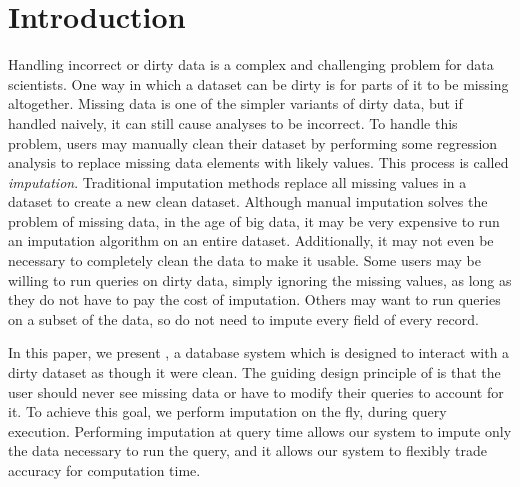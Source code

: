 \section{Introduction}

Handling incorrect or dirty data is a complex and challenging problem for data scientists.
One way in which a dataset can be dirty is for parts of it to be missing altogether.
Missing data is one of the simpler variants of dirty data, but if handled naively, it can still cause analyses to be incorrect.
To handle this problem, users may manually clean their dataset by performing some regression analysis to replace missing data elements with likely values.
This process is called \emph{imputation}.
Traditional imputation methods replace all missing values in a dataset to create a new clean dataset.
Although manual imputation solves the problem of missing data, in the age of big data, it may be very expensive to run an imputation algorithm on an entire dataset.
Additionally, it may not even be necessary to completely clean the data to make it usable.
Some users may be willing to run queries on dirty data, simply ignoring the missing values, as long as they do not have to pay the cost of imputation.
Others may want to run queries on a subset of the data, so do not need to impute every field of every record.

In this paper, we present \ProjectName{}, a database system which is designed to interact with a dirty dataset as though it were clean.
The guiding design principle of \ProjectName{} is that the user should never see missing data or have to modify their queries to account for it.
To achieve this goal, we perform imputation on the fly, during query execution.
Performing imputation at query time allows our system to impute only the data necessary to run the query, and it allows our system to flexibly trade accuracy for computation time.

